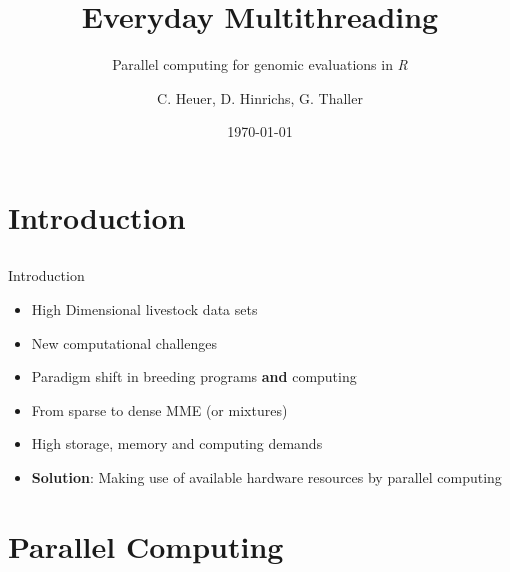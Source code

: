 \documentclass[xcolor=dvipsnames,aspectratio=169]{beamer}
\title[Parallel Computing in R]{Everyday Multithreading}
\subtitle{Parallel computing for genomic evaluations in \textit{R}}
\author{C. Heuer, D. Hinrichs, G. Thaller}
\institute[]{Institute of Animal Breeding and Husbandry, Kiel University}
\date{\today}
\begin{document}
\begin{frame}
\titlepage
\end{frame}


\section{Introduction}
\subsection*{}
\begin{frame}{Introduction}
\pause
\begin{itemize}
\item High Dimensional livestock data sets 
\item New computational challenges
\item Paradigm shift in breeding programs \textbf{and} computing
\item From sparse to dense MME (or mixtures)
\item High storage, memory and computing demands
\pause
\item \textbf{Solution}: Making use of available hardware resources by parallel computing
\end{itemize}
\end{frame}



\section{Parallel Computing}
\end{document}
